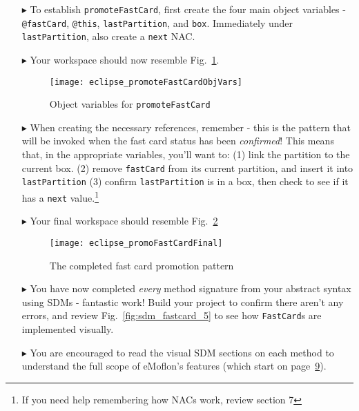 \begin{itemize}
\item[$\blacktriangleright$] To establish \texttt{promoteFastCard}, first create the four main object variables - \texttt{@fastCard}, \texttt{@this},
\texttt{lastPartition}, and \texttt{box}. Immediately under \texttt{lastPartition}, also create a \texttt{next} NAC.

\vspace{0.5cm}

\item[$\blacktriangleright$] Your workspace should now resemble Fig.~\ref{fig:objVarFastCard}.

\begin{figure}[htp]
\begin{center}
  \texttt{[image: eclipse\_promoteFastCardObjVars]}
  \caption{Object variables for \texttt{promoteFastCard}}
  \label{fig:objVarFastCard}
\end{center}
\end{figure}

\item[$\blacktriangleright$] When creating the necessary references, remember - this is the pattern that will be invoked when the fast card status has been
\emph{confirmed}! This means that, in the appropriate variables, you'll want to:
(1) link the partition to the current box.
(2) remove \texttt{fastCard} from its current partition, and insert it into \texttt{lastPartition}
(3) confirm \texttt{lastPartition} is in a box, then check to see if it has a \texttt{next} value.\footnote{If you need help remembering how NACs work, review
section 7}

\vspace{0.5cm}

\item[$\blacktriangleright$] Your final workspace should resemble Fig.~\ref{fig:promoFastCardFinal}

\newpage

\vspace*{1cm}

\begin{figure}[htp]
\begin{center}
  \texttt{[image: eclipse\_promoFastCardFinal]}
  \caption{The completed fast card promotion pattern}
  \label{fig:promoFastCardFinal}
\end{center}
\end{figure}

\vspace{0.5cm}

\item[$\blacktriangleright$] You have now completed \emph{every} method signature from your abstract syntax using SDMs - fantastic work! Build your project to
confirm there aren't any errors, and review Fig.~\ref{fig:sdm_fastcard_5} to see how \texttt{FastCard}s are implemented visually. 

\item[$\blacktriangleright$] You are encouraged to read the visual SDM sections on each method to understand the full scope of eMoflon's features (which start
on page~\hyperlink{page.9}{9}). 
  
\end{itemize}
